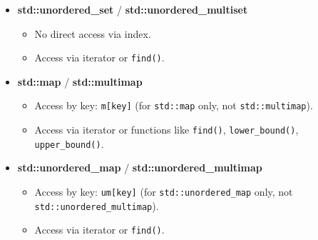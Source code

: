 \documentclass{report}
\begin{document}
\begin{itemize}
    \item \textbf{std::unordered\_set} / \textbf{std::unordered\_multiset}
    \begin{itemize}
        \item No direct access via index.
        \item Access via iterator or \texttt{find()}.
    \end{itemize}
    
    \item \textbf{std::map} / \textbf{std::multimap}
    \begin{itemize}
        \item Access by key: \texttt{m[key]} (for \texttt{std::map} only, not \texttt{std::multimap}).
        \item Access via iterator or functions like \texttt{find()}, \texttt{lower\_bound()}, \texttt{upper\_bound()}.
    \end{itemize}
    
    \item \textbf{std::unordered\_map} / \textbf{std::unordered\_multimap}
    \begin{itemize}
        \item Access by key: \texttt{um[key]} (for \texttt{std::unordered\_map} only, not \texttt{std::unordered\_multimap}).
        \item Access via iterator or \texttt{find()}.
    \end{itemize}
\end{itemize}



   \pagebreak 
\end{document}
